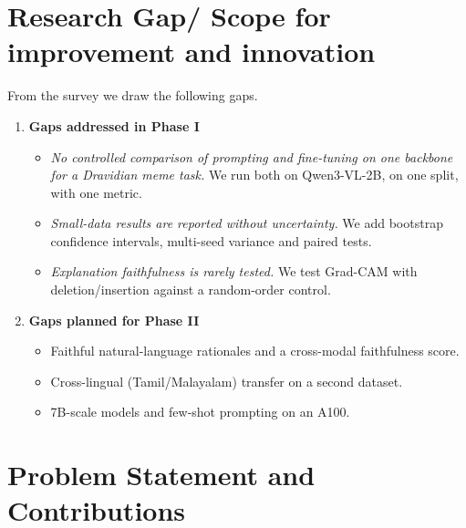 \section{Research Gap/ Scope for improvement and innovation}

From the survey we draw the following gaps.

\begin{enumerate}
    \item \textbf{Gaps addressed in Phase I}
    \begin{itemize}
        \item \emph{No controlled comparison of prompting and fine-tuning on one backbone for a Dravidian meme task.} We run both on Qwen3-VL-2B, on one split, with one metric.
        \item \emph{Small-data results are reported without uncertainty.} We add bootstrap confidence intervals, multi-seed variance and paired tests.
        \item \emph{Explanation faithfulness is rarely tested.} We test Grad-CAM with deletion/insertion against a random-order control.
    \end{itemize}
    \item \textbf{Gaps planned for Phase II}
    \begin{itemize}
        \item Faithful natural-language rationales and a cross-modal faithfulness score.
        \item Cross-lingual (Tamil/Malayalam) transfer on a second dataset.
        \item 7B-scale models and few-shot prompting on an A100.
    \end{itemize}
\end{enumerate}

\section{Problem Statement and Contributions}

